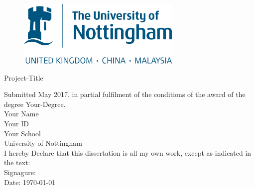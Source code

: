 
\begin{titlepage}
  \begin{figure}[H]
    \centering
    \includegraphics[width=0.7\textwidth]{University_of_Nottingham}
  \end{figure}

  \center

  {\Huge Project-Title\\[1cm]}

  
  Submitted May 2017, in partial fulfilment of the conditions of the
  award of the degree Your-Degree.\\[1cm]

  {\Large Your Name}\\[1cm]

  {\Large Your ID}\\[1cm]

  {\Large Your School}\\[1cm]

  {\Large University of Nottingham}\\[1cm]

  I hereby Declare that this dissertation is all my own work, except
  as indicated in the text:\\[1cm]

  Signagure: \underline{\hspace{6cm}}\\[1cm]

  Date: \today

  \vfill
\end{titlepage}
\newpage

